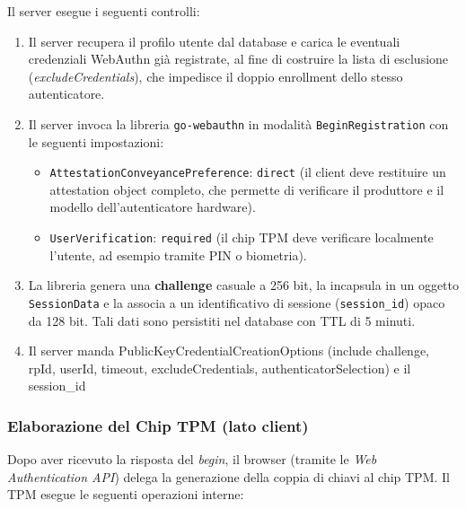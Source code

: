 Il server esegue i seguenti controlli:
\begin{enumerate}
  \item Il server recupera il profilo utente dal database e carica
    le eventuali credenziali WebAuthn già registrate, al fine di
    costruire la lista di esclusione (\emph{excludeCredentials}), che
    impedisce il doppio enrollment dello stesso autenticatore.

  \item Il server invoca la libreria \texttt{go-webauthn} in modalità
    \texttt{BeginRegistration} con le seguenti impostazioni:
    \begin{itemize}
      \item \texttt{AttestationConveyancePreference}: \texttt{direct}
        (il client deve restituire un attestation object completo,
        che permette di verificare il produttore e il modello
        dell'autenticatore hardware).
      \item \texttt{UserVerification}: \texttt{required} (il chip TPM
        deve verificare localmente l'utente, ad esempio tramite PIN o
        biometria).
    \end{itemize}

  \item La libreria genera una \textbf{challenge} casuale a 256 bit, la incapsula in un oggetto
    \texttt{SessionData} e la associa a un identificativo di sessione
    (\texttt{session\_id}) opaco da 128 bit. Tali dati sono persistiti
    nel database con TTL di 5 minuti.
    \item Il server manda PublicKeyCredentialCreationOptions
(include challenge, rpId, userId, timeout,
excludeCredentials, authenticatorSelection) e il
session\_id
\end{enumerate}

\subsubsection*{Elaborazione del Chip TPM (lato client)}

Dopo aver ricevuto la risposta del \emph{begin}, il browser (tramite le
\emph{Web Authentication API}) delega la generazione della coppia di chiavi
al chip TPM. Il TPM esegue le seguenti operazioni interne:

